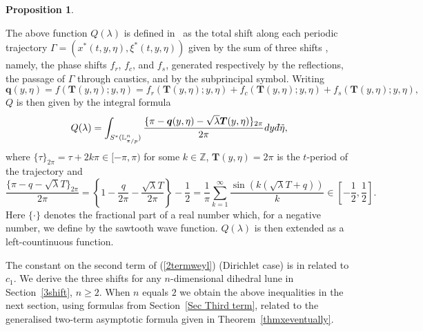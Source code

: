 \documentclass[11pt,a4paper,times]{amsart}
\theoremstyle{plain}
\newtheorem{proposition}{Proposition}[section]
\theoremstyle{definition}
\numberwithin{equation}{section}
\newcommand{\ci}{c_{1}}
\newcommand{\ds}{\displaystyle}
\newcommand{\Z}{\mathbb{Z}}
\newcommand{\fr}[2]{\frac{\ds #1}{\ds #2}}
\newcommand{\dbar}{d\hspace*{-0.08em}\bar{}\hspace*{0.1em}}
\begin{document}
{\begin{proposition}
\end{proposition}
The above function $Q(\lambda)$ is defined in~\cite[Theorem~1.7.6 (1.7.9)]{sava} as the total shift along each periodic trajectory $\Gamma=(x^*(t, y, \eta), \xi^*(t,y, \eta))$
given by the sum of three shifts \cite[Definition  1.7.2]{sava},
namely, the phase shifts $f_{r}$, $f_{c}$, and $f_{s}$, generated respectively by the reflections, 
the passage of $\Gamma$ through caustics, and by the subprincipal symbol. Writing
  \[
  \boldsymbol{q}(y, \eta)=f(\boldsymbol{T}(y,\eta); y, \eta)= f_r(\boldsymbol{T}(y,\eta); y, \eta)+f_c(\boldsymbol{T}(y,\eta); y, \eta)+ f_s(\boldsymbol{T}(y,\eta); y, \eta),
  \]
$Q$ is then given by the  integral formula
\begin{equation}\label{integral}
Q(\lambda)=
\int_{S^*(\mathbb{L}^n_{\pi/p})}\frac{\{\pi-\boldsymbol{q}(y,\eta)-\sqrt{\lambda} \boldsymbol{T}(y,\eta)\}_{2\pi}}{2\pi} dy \dbar\tilde{\eta},
\end{equation}
where $\{\tau\}_{2\pi}=\tau+2k\pi
\in [-\pi, \pi)$ for some $k\in \Z$,  $\boldsymbol{T}(y,\eta)
=2\pi$ is the $t$-period of the trajectory and
\begin{equation}\label{Qbounds}
\frac{\{\pi-q-\sqrt{\lambda} T\}_{2\pi}}{2\pi}=\left\{{1}-\frac{q }{2\pi}-\fr{\sqrt{\lambda} T}{2\pi}\right\}-\frac{1}{2}
=
\frac{1}{\pi}\sum_{k=1}^{\infty} \frac{\sin(k(\sqrt{\lambda} T +q))}{k}\in \left[-\frac{1}{2}, \frac{1}{2}\right].
\end{equation}
Here $\{\cdot\}$ denotes the fractional part of a real number which, for a negative number, we define by the  sawtooth wave function. $Q(\lambda)$ is then extended as a left-countinuous function. %

The  constant  on the second term of (\ref{2termweyl})  (Dirichlet case) is  in \cite[Theorem 1.6.1]{sava} related to
$\ci $.
We derive the three shifts for any $n$-dimensional dihedral lune in Section~\ref{3shift}, $n\geq 2$. When $n$ equals $2$ we obtain the above inequalities in the next section,
using formulas from Section~\ref{Sec Third term}, related to the  generalised two-term asymptotic formula given in Theorem~\ref{thmxeventually}. \\[2mm]
}
\end{document}
